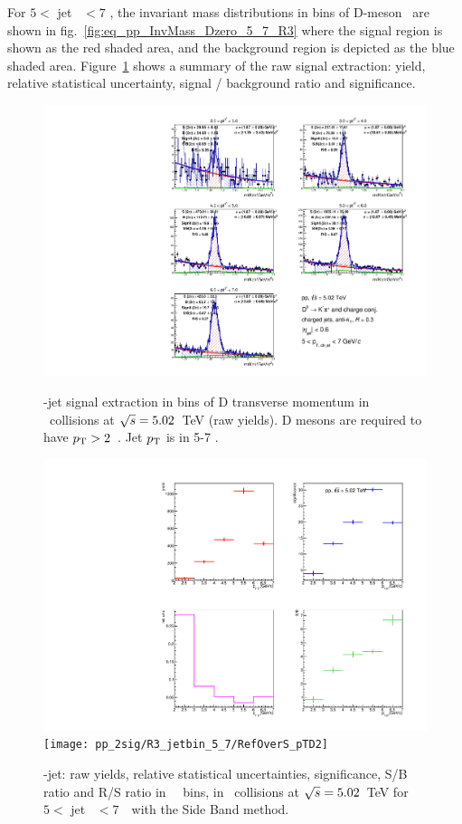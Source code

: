 For $5<$ jet \pt\ $<7$ \GeVc, the invariant mass distributions in bins of D-meson \pt\ are shown in fig.~\ref{fig:eq_pp_InvMass_Dzero_5_7_R3} where  the signal region is shown as the red shaded area, and the background region is depicted as the blue shaded area.
Figure~\ref{fig:eq_pp_signalParams_5_7_R3} shows a summary of the raw signal extraction:
yield, relative statistical uncertainty, signal / background ratio and significance.
\begin{figure}[bth]
\centering
\begin{minipage}{.65\textwidth}
  \centering
\includegraphics[width=\textwidth]{pp_2sig/R3_jetbin_5_7/invMass_pTD2}
\caption{\Dzero-jet signal extraction in bins of D transverse momentum in \pp\ collisions at $\sqrt{s}=5.02$~TeV (raw yields). D mesons are required to have $p_{\rm T}>2$~\GeVc. Jet $p_{\rm T}$ is in 5-7 \GeVc.
}
\label{fig:eq_pp_InvMass_Dzero_5_7_R3}
\end{minipage}%
\begin{minipage}{.4\textwidth}
  \centering
  \includegraphics[width=\textwidth]{pp_2sig/R3_jetbin_5_7/signalParams_pTD2}
  \texttt{[image: pp\_2sig/R3\_jetbin\_5\_7/RefOverS\_pTD2]}
\caption{%
\Dzero-jet: raw yields, relative statistical uncertainties, significance, S/B ratio and R/S ratio in \Dzero\ \pt\ bins, in \pp\ collisions at $\sqrt{s}=5.02$~TeV for $5<$ jet \pt\ $<7$~\GeVc\ with the Side Band method.
}
\label{fig:eq_pp_signalParams_5_7_R3}
\end{minipage}
\end{figure}
